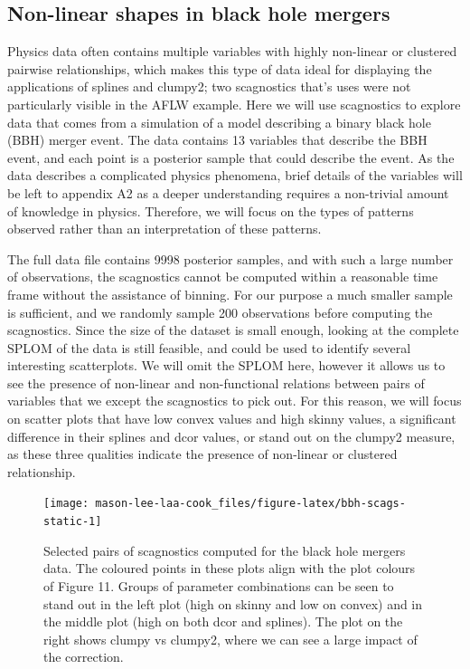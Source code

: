 \subsection{Non-linear shapes in black hole mergers}\label{non-linear-shapes-in-black-hole-mergers}

Physics data often contains multiple variables with highly non-linear or clustered pairwise relationships, which makes this type of data ideal for displaying the applications of splines and clumpy2; two scagnostics that's uses were not particularly visible in the AFLW example. Here we will use scagnostics to explore data that comes from a simulation of a model describing a binary black hole (BBH) merger event. The data contains 13 variables that describe the BBH event, and each point is a posterior sample that could describe the event. As the data describes a complicated physics phenomena, brief details of the variables will be left to appendix A2 as a deeper understanding requires a non-trivial amount of knowledge in physics. Therefore, we will focus on the types of patterns observed rather than an interpretation of these patterns.

The full data file contains 9998 posterior samples, and with such a large number of observations, the scagnostics cannot be computed within a reasonable time frame without the assistance of binning. For our purpose a much smaller sample is sufficient, and we randomly sample 200 observations before computing the scagnostics. Since the size of the dataset is small enough, looking at the complete SPLOM of the data is still feasible, and could be used to identify several interesting scatterplots. We will omit the SPLOM here, however it allows us to see the presence of non-linear and non-functional relations between pairs of variables that we except the scagnostics to pick out. For this reason, we will focus on scatter plots that have low convex values and high skinny values, a significant difference in their splines and dcor values, or stand out on the clumpy2 measure, as these three qualities indicate the presence of non-linear or clustered relationship.

\begin{figure}
\texttt{[image: mason-lee-laa-cook\_files/figure-latex/bbh-scags-static-1]} \caption{Selected pairs of scagnostics computed for the black hole mergers data. The coloured points in these plots align with the plot colours of Figure 11. Groups of parameter combinations can be seen to stand out in the left plot (high on skinny and low on convex) and in the middle plot (high on both dcor and splines). The plot on the right shows clumpy vs clumpy2, where we can see a large impact of the correction. }\label{fig:bbh-scags-static}
\end{figure}

